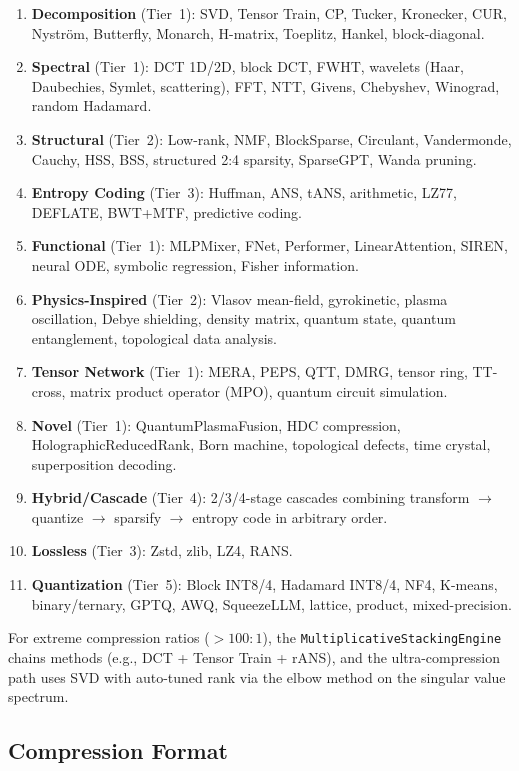 \documentclass[11pt,a4paper,twocolumn]{article}
\begin{document}
\begin{enumerate}
	\item \textbf{Decomposition} (Tier~1): SVD, Tensor Train, CP, Tucker, Kronecker, CUR, Nyström, Butterfly, Monarch, H-matrix, Toeplitz, Hankel, block-diagonal.
	\item \textbf{Spectral} (Tier~1): DCT 1D/2D, block DCT, FWHT, wavelets (Haar, Daubechies, Symlet, scattering), FFT, NTT, Givens, Chebyshev, Winograd, random Hadamard.
	\item \textbf{Structural} (Tier~2): Low-rank, NMF, BlockSparse, Circulant, Vandermonde, Cauchy, HSS, BSS, structured 2:4 sparsity, SparseGPT, Wanda pruning.
	\item \textbf{Entropy Coding} (Tier~3): Huffman, ANS, tANS, arithmetic, LZ77, DEFLATE, BWT+MTF, predictive coding.
	\item \textbf{Functional} (Tier~1): MLPMixer, FNet, Performer, LinearAttention, SIREN, neural ODE, symbolic regression, Fisher information.
	\item \textbf{Physics-Inspired} (Tier~2): Vlasov mean-field, gyrokinetic, plasma oscillation, Debye shielding, density matrix, quantum state, quantum entanglement, topological data analysis.
	\item \textbf{Tensor Network} (Tier~1): MERA, PEPS, QTT, DMRG, tensor ring, TT-cross, matrix product operator (MPO), quantum circuit simulation.
	\item \textbf{Novel} (Tier~1): QuantumPlasmaFusion, HDC compression, HolographicReducedRank, Born machine, topological defects, time crystal, superposition decoding.
	\item \textbf{Hybrid/Cascade} (Tier~4): 2/3/4-stage cascades combining transform $\to$ quantize $\to$ sparsify $\to$ entropy code in arbitrary order.
	\item \textbf{Lossless} (Tier~3): Zstd, zlib, LZ4, RANS.
	\item \textbf{Quantization} (Tier~5): Block INT8/4, Hadamard INT8/4, NF4, K-means, binary/ternary, GPTQ, AWQ, SqueezeLLM, lattice, product, mixed-precision.
\end{enumerate}

For extreme compression ratios ($>100:1$), the \texttt{MultiplicativeStackingEngine} chains methods (e.g., DCT + Tensor Train + rANS), and the ultra-compression path uses SVD with auto-tuned rank via the elbow method on the singular value spectrum.

\subsection{Compression Format}
\end{document}

